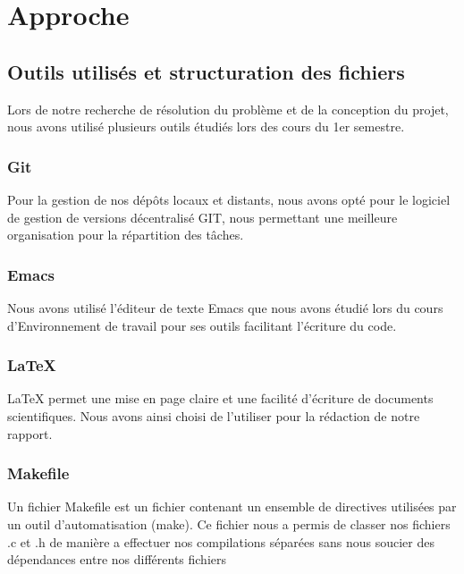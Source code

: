 \documentclass{article}
\begin{document}
\newpage
\section{Approche}
    {
    
    \subsection{Outils utilisés et structuration des fichiers}
    {
    Lors de notre recherche de résolution du problème et de la conception du projet, nous avons utilisé plusieurs outils étudiés lors des cours du 1er semestre.
    
        \subsubsection{Git}
        {
        Pour la gestion de nos dépôts locaux et distants, nous avons opté pour le logiciel de gestion de versions décentralisé GIT, nous permettant une meilleure organisation pour la répartition des tâches.
        
        }
        
 
        \subsubsection{Emacs}
        {
        Nous avons utilisé l'éditeur de texte Emacs que nous avons étudié lors du cours d'Environnement de travail pour ses outils facilitant l'écriture du code.
        
        }
    
     
        \subsubsection{\LaTeX}
        {
        LaTeX permet une mise en page claire et une facilité d'écriture de documents scientifiques. Nous avons ainsi choisi de l'utiliser pour la rédaction de notre rapport.
        }
    
        \subsubsection{Makefile}
        {
        Un fichier Makefile est un fichier contenant un ensemble de directives utilisées par un outil d'automatisation (make). Ce fichier nous a permis de classer nos fichiers .c et .h de manière a effectuer nos compilations séparées sans nous soucier des dépendances entre nos différents fichiers
        
}}}
\end{document}
